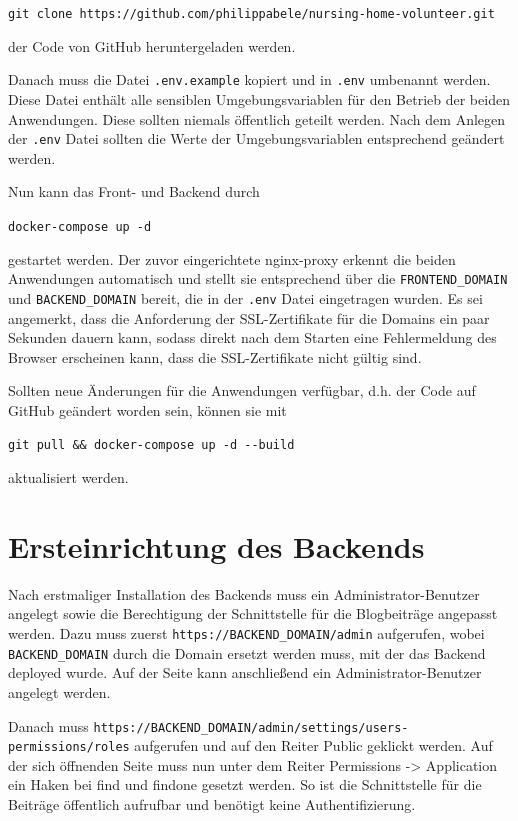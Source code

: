 \begin{center}
  \lstinline{git clone https://github.com/philippabele/nursing-home-volunteer.git}
\end{center}

der Code von GitHub heruntergeladen werden.

Danach muss die Datei \lstinline{.env.example} kopiert und in \lstinline{.env} umbenannt werden. Diese Datei enthält alle sensiblen Umgebungsvariablen für den Betrieb der beiden Anwendungen. Diese sollten niemals öffentlich geteilt werden. Nach dem Anlegen der \lstinline{.env} Datei sollten die Werte der Umgebungsvariablen entsprechend geändert werden.

Nun kann das Front- und Backend durch

\begin{center}
  \lstinline{docker-compose up -d}
\end{center}

gestartet werden. Der zuvor eingerichtete nginx-proxy erkennt die beiden Anwendungen automatisch und stellt sie entsprechend über die \lstinline{FRONTEND_DOMAIN} und \lstinline{BACKEND_DOMAIN} bereit, die in der \lstinline{.env} Datei eingetragen wurden. Es sei angemerkt, dass die Anforderung der SSL-Zertifikate für die Domains ein paar Sekunden dauern kann, sodass direkt nach dem Starten eine Fehlermeldung des Browser erscheinen kann, dass die SSL-Zertifikate nicht gültig sind.

Sollten neue Änderungen für die Anwendungen verfügbar, d.h. der Code auf GitHub geändert worden sein, können sie mit

\begin{center}
  \lstinline{git pull && docker-compose up -d --build}
\end{center}

aktualisiert werden.

\section{Ersteinrichtung des Backends}
Nach erstmaliger Installation des Backends muss ein Administrator-Benutzer angelegt sowie die Berechtigung der Schnittstelle für die Blogbeiträge angepasst werden. Dazu muss zuerst \lstinline{https://BACKEND_DOMAIN/admin} aufgerufen, wobei \lstinline{BACKEND_DOMAIN} durch die Domain ersetzt werden muss, mit der das Backend deployed wurde. Auf der Seite kann anschließend ein Administrator-Benutzer angelegt werden.

Danach muss \lstinline{https://BACKEND_DOMAIN/admin/settings/users-permissions/roles} aufgerufen und auf den Reiter \glqq Public\grqq{} geklickt werden. Auf der sich öffnenden Seite muss nun unter dem Reiter \glqq Permissions -> Application\grqq{} ein Haken bei \glqq find\grqq{} und \glqq findone\grqq{} gesetzt werden. So ist die Schnittstelle für die Beiträge öffentlich aufrufbar und benötigt keine Authentifizierung.

